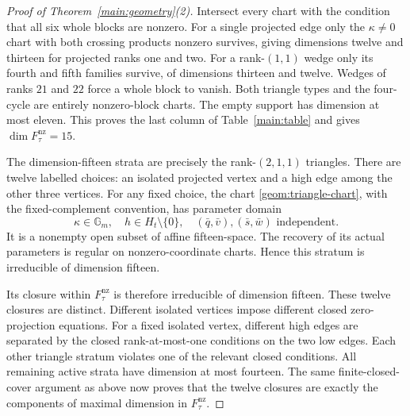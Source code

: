 \documentclass[11pt,letterpaper]{article}
\newcommand{\Gm}{\mathbb G_m}
\newcommand{\Fact}{F_\tau^{\mathrm{nz}}}
\theoremstyle{definition}
\begin{document}
\begin{proof}[Proof of Theorem~\ref{main:geometry}(2)]
Intersect every chart with the condition that all six whole blocks are
nonzero. For a single projected edge only the \(\kappa\ne0\) chart with
both crossing products nonzero survives, giving dimensions twelve and
thirteen for projected ranks one and two.
For a rank-\((1,1)\) wedge only its fourth and fifth families survive,
of dimensions thirteen and twelve. Wedges of ranks \(21\) and \(22\)
force a whole block to vanish. Both triangle types and the four-cycle
are entirely nonzero-block charts. The empty support has dimension at
most eleven. This proves the last column of Table~\ref{main:table}
and gives \(\dim\Fact=15\).

The dimension-fifteen strata are precisely the rank-\((2,1,1)\) triangles.
There are twelve labelled choices: an isolated projected vertex and a
high edge among the other three vertices.
For any fixed choice, the chart \eqref{geom:triangle-chart}, with the
fixed-complement convention, has parameter domain
\[
 \kappa\in\Gm,\quad h\in H_t\setminus\{0\},\quad
 (\bar q,\bar v),(\bar s,\bar w)\text{ independent}.
\]
It is a nonempty open subset of affine fifteen-space. The recovery of
its actual parameters is regular on nonzero-coordinate charts. Hence
this stratum is irreducible of dimension fifteen.

Its closure within \(\Fact\) is therefore irreducible of dimension fifteen.
These twelve closures are distinct. Different isolated vertices impose
different closed zero-projection equations. For a fixed isolated vertex,
different high edges are separated by the closed rank-at-most-one
conditions on the two low edges. Each other triangle stratum violates
one of the relevant closed conditions.
All remaining active strata have dimension at most fourteen.
The same finite-closed-cover argument as above now proves that the
twelve closures are exactly the components of maximal dimension in
\(\Fact\).
\end{proof}
\end{document}
